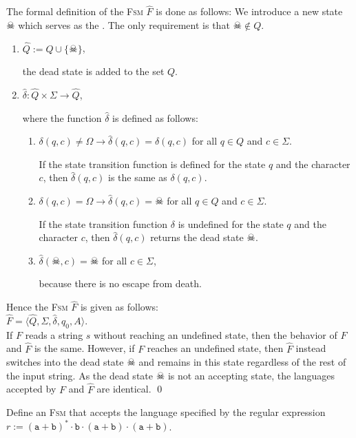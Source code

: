 The formal definition of the \textsc{Fsm} $\widehat{F}$ is done as follows:
We introduce a new state $\skull$ which serves as the .  The only requirement is that $\skull \not\in Q$.
\begin{enumerate}
\item $\widehat{Q} := Q \cup \{ \skull \}$,

      the dead state is added to the set  $Q$.
\item $\widehat{\delta} : \widehat{Q} \times \Sigma \rightarrow \widehat{Q}$,

      where the function $\widehat{\delta}$ is defined as follows:
      \begin{enumerate}
      \item $\delta(q,c) \not= \Omega \rightarrow \widehat{\delta}(q,c) = \delta(q,c)$ \quad  for all $q \in Q$ and $c \in \Sigma$.

            If the state transition function is defined for the state  $q$ and the character
            $c$, then $\widehat{\delta}(q,c)$ is the same as $\delta(q,c)$.
      \item $\delta(q,c) = \Omega \rightarrow \widehat{\delta}(q,c) = \skull$  \quad for all $q \in Q$ and $c \in \Sigma$.

            If the state transition function $\delta$ is undefined for the state $q$ and the character
            $c$, then $\widehat{\delta}(q,c)$ returns the dead state $\skull$.
      \item $\widehat{\delta}(\skull, c) = \skull$ \quad for all $c \in \Sigma$,

            because there is no escape from death.
      \end{enumerate}
\end{enumerate}
Hence the \textsc{Fsm}  $\widehat{F}$ is given as follows:
\\[0.2cm]
\hspace*{1.3cm}
$\widehat{F} = \langle \widehat{Q}, \Sigma, \widehat{\delta}, q_0, A \rangle$.
\\[0.2cm]
If  $F$ reads a string $s$ without reaching an undefined state, then the behavior of $F$ and $\widehat{F}$ is the same.
However, if $F$ reaches an undefined state, then $\widehat{F}$ instead switches into the dead state 
$\skull$ and remains in this state regardless of the rest of the input string.  As the dead state $\skull$
is not an accepting state, the languages accepted by  $F$ and $\widehat{F}$ are identical. \qed 

\exerciseEng
Define an \textsc{Fsm} that accepts the language specified by the regular expression 
\\[0.2cm]
\hspace*{1.3cm}
$r := (\texttt{a}+\texttt{b})^* \cdot \texttt{b} \cdot (\texttt{a}+\texttt{b}) \cdot
(\texttt{a}+\texttt{b})$. \eox

